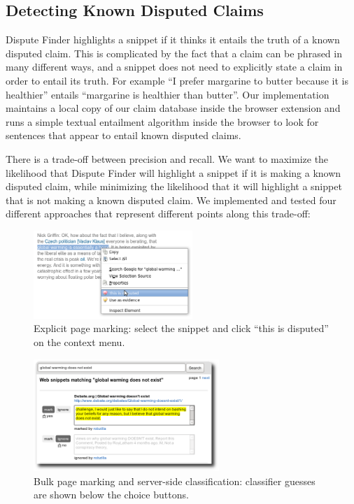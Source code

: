 \documentclass{www2010-submission}
\newcommand{\todo}[1]{}
\begin{document}
\todo{Say how many disputed claims}
\todo{talk about duplicates}
\todo{Actually import the Politifact data}


\subsection{Detecting Known Disputed Claims}

Dispute Finder highlights a snippet if it thinks it entails the truth of a known disputed claim. This is complicated by the fact that a claim can be phrased in many different ways, and a snippet does not need to explicitly state a claim in order to entail its truth. For example ``I prefer margarine to butter because it is healthier'' entails ``margarine is healthier than butter''. Our implementation maintains a local copy of our claim database inside the browser extension and runs a simple textual entailment algorithm inside the browser to look for sentences that appear to entail known disputed claims. 

There is a trade-off between precision and recall. We want to maximize the likelihood that Dispute Finder will highlight a snippet if it is making a known disputed claim, while minimizing the likelihood that it will highlight a snippet that is not making a known disputed claim. We implemented and tested four different approaches that represent different points along this trade-off:

\begin{figure}[tb]
	\begin{center}
	\includegraphics[width=6cm]{pictures/mark_disputed.png}
	\caption{Explicit page marking: select the snippet and click ``this is disputed'' on the context menu.}
	\label{mark_disputed}
	\end{center}
\end{figure}

\begin{figure}[tb]
	\begin{center}
	\includegraphics[width=7cm]{pictures/training2.png}
	\caption{Bulk page marking and server-side classification: classifier guesses are shown below the choice buttons.}
	\label{training}
	\end{center}
\end{figure}
\end{document}

